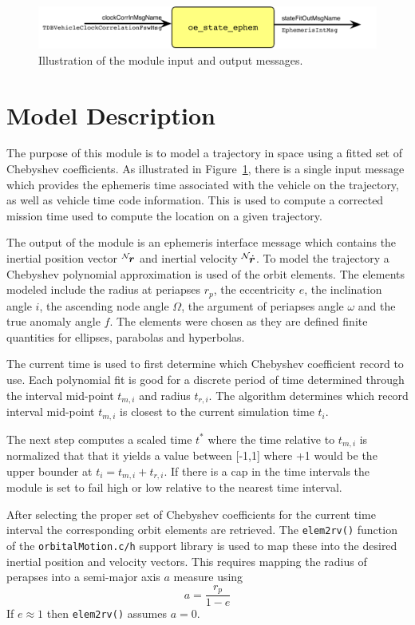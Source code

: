 

\begin{figure}[h]
	\centerline{
		\includegraphics{Figures/moduleImg}
	}
	\caption{Illustration of the module input and output messages.}
	\label{fig:moduleImg}
\end{figure}


\section{Model Description}
The purpose of this module is to model a trajectory in space using a fitted set of Chebyshev coefficients.  As illustrated in Figure~\ref{fig:moduleImg}, there is a single input message which provides the ephemeris time associated with the vehicle on the trajectory, as well as vehicle time code information.  This is used to compute a corrected mission time used to compute the location on a given trajectory.

The output of the module is an ephemeris interface message which contains the inertial position vector $\leftexp{N}{\bm r}$ and inertial velocity $\leftexp{N}{\dot{\bm r}}$.  To model the trajectory  a Chebyshev polynomial approximation is used of the orbit elements.  The elements modeled include the radius at periapses $r_{p}$, the eccentricity $e$, the inclination angle $i$, the ascending node angle $\Omega$, the argument of periapses angle $\omega$ and the true anomaly angle $f$. The elements were chosen as they are defined finite quantities for ellipses, parabolas and hyperbolas.

The current time is used to first determine which Chebyshev coefficient record to use.  Each polynomial fit is good for a discrete period of time determined through the interval mid-point $t_{m,i}$ and radius $t_{r,i}$.   The algorithm determines which record interval mid-point $t_{m,i}$ is closest to the current simulation time $t_{i}$.  

The next step computes a scaled time $t^{\ast}$ where the time relative to $t_{m,i}$ is normalized that that it yields a value between [-1,1] where +1 would be the upper bounder at $t_{i} = t_{m,i} + t_{r,i}$.  If there is a cap in the time intervals the module is set to fail high or low relative to the nearest time interval. 


After selecting the proper set of Chebyshev coefficients for the current time interval the corresponding orbit elements are retrieved.  The {\tt elem2rv()} function of the {\tt orbitalMotion.c/h} support library is used to map these into the desired inertial position and velocity vectors.  This requires mapping the radius of perapses into a semi-major axis $a$ measure using
\begin{equation}
	a = \frac{r_{p}}{1-e}
\end{equation}
If $e \approx 1$ then {\tt elem2rv()} assumes $a = 0$.  

